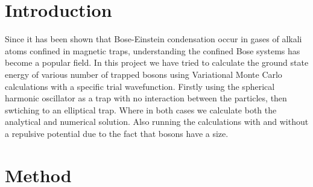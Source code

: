 \documentclass[12pt]{article}
\begin{document}
  \section{Introduction}
  Since it has been shown that Bose-Einstein condensation occur in gases of alkali 
  atoms confined in magnetic traps, understanding the confined Bose systems has 
  become a popular field. In this project we have tried to calculate the ground 
  state energy of various number of trapped bosons using Variational Monte Carlo 
  calculations with a specific trial wavefunction. Firstly using the spherical 
  harmonic oscillator as a trap with no interaction between the particles, then
  swtiching to an elliptical trap. Where in both cases we calculate both the 
  analytical and numerical solution. Also running the calculations with and 
  without a repulsive potential due to the fact that bosons have a size.

  \section{Method}
\end{document}
